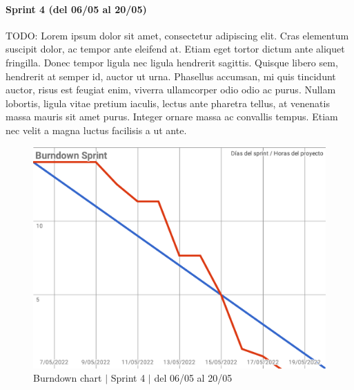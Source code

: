 \paragraph{Sprint 4 (del 06/05 al 20/05)}
TODO: Lorem ipsum dolor sit amet, consectetur adipiscing elit. Cras elementum suscipit dolor, ac tempor ante eleifend at. Etiam eget tortor dictum ante aliquet fringilla. Donec tempor ligula nec ligula hendrerit sagittis. Quisque libero sem, hendrerit at semper id, auctor ut urna. Phasellus accumsan, mi quis tincidunt auctor, risus est feugiat enim, viverra ullamcorper odio odio ac purus. Nullam lobortis, ligula vitae pretium iaculis, lectus ante pharetra tellus, at venenatis massa mauris sit amet purus. Integer ornare massa ac convallis tempus. Etiam nec velit a magna luctus facilisis a ut ante.
\begin{figure}[H]
    \centering
    \includegraphics[width=1\linewidth]{text/image/BurndownChart4.pdf}
    \caption{Burndown chart $|$ Sprint 4 $|$ del 06/05 al 20/05}
    \label{fig:burndown_chart_4}
\end{figure}

\newpage
